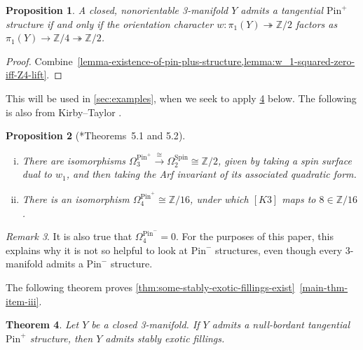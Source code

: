 \documentclass[a4paper, reqno]{amsart}
\newtheorem{proposition}{Proposition}[section]
\newtheorem{theorem}[proposition]{Theorem}
\theoremstyle{definition}
\theoremstyle{remark}
\newtheorem{remark}[proposition]{Remark}
\newcommand{\Z}{\mathbb{Z}}
\newcommand{\spin}{\mathrm{Spin}}
\newcommand{\pinplus}{{\mathrm{Pin}^+}\!}
\newcommand{\pinminus}{{\mathrm{Pin}^-}}
\newcommand{\onto}{\twoheadrightarrow}
\begin{document}
\begin{proposition}\label{lemma:condition-for-pin-plus}
A closed, nonorientable 3-manifold $Y$ admits a tangential $\pinplus$ structure if and only if the orientation character $w \colon \pi_1(Y) \onto \Z/2$ factors as $\pi_1(Y) \to \Z/4 \twoheadrightarrow \Z/2$. 
\end{proposition}

\begin{proof}
     Combine~\cref{lemma-existence-of-pin-plus-structure,lemma:w_1-squared-zero-iff-Z4-lift}.
\end{proof}

This will be used in \cref{sec:examples}, when we seek to apply \cref{thm:pinplus-summary} below. 
The following is also from Kirby--Taylor \cite{kirby-taylor:pin}.

\begin{proposition}[\cite{kirby-taylor:pin}*{Theorems~5.1 and 5.2}]
\label{prop:Kirby-taylor}
\leavevmode
\begin{enumerate}[(i)]
\item\label{item:kirby-taylor-i}
There are isomorphisms $\Omega_3^\pinplus\xrightarrow{\cong}\Omega_2^\spin \cong \Z/2$, given by taking a spin surface dual to $w_1$, and then taking the Arf invariant of its associated quadratic form. 
\item\label{item:kirby-taylor-ii}
There is an isomorphism $\Omega^{\pinplus}_4 \cong \Z/16$, under which $[K3]$ maps to $8 \in \Z/16$.
\end{enumerate}
\end{proposition}

\begin{remark}
It is also true that $\Omega^{\pinminus}_4=0$. For the purposes of this paper, this explains why it is not so helpful to look at $\pinminus$  structures, even though every 3-manifold admits a $\pinminus$ structure. 
\end{remark}

The following theorem  proves \cref{thm:some-stably-exotic-fillings-exist}~\eqref{main-thm-item-iii}.


\begin{theorem}\label{thm:pinplus-summary}
    Let $Y$ be a closed 3-manifold. 
    If $Y$ admits a null-bordant tangential $\pinplus$ structure, then $Y$ admits stably exotic fillings. 
\end{theorem}
\end{document}
